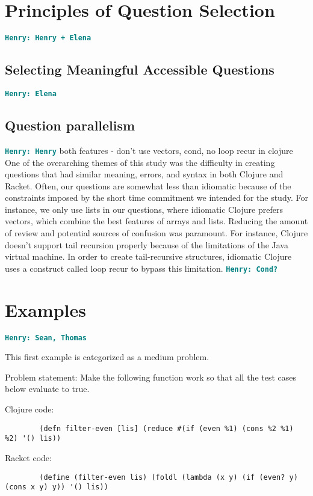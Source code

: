 \documentclass[12pt]{article}
\newcommand{\comment}[1]{{\bf \tt  {#1}}}
\newcommand{\hfcomment}[1]{\textcolor{Teal}{\comment{Henry: {#1}}}}
\begin{document}
\section{Principles of Question Selection}\label{sec:select}
	\hfcomment{Henry + Elena}
	\subsection{Selecting Meaningful Accessible Questions}\label{sec:meaning}
	\hfcomment{Elena}
	\subsection{Question parallelism}\label{sec:parallel}
	\hfcomment{Henry}
	both features - don't use vectors, cond, no loop recur in clojure
	One of the overarching themes of this study was the difficulty in creating questions that had similar meaning, errors, and syntax in both Clojure and Racket.
	 Often, our questions are somewhat less than idiomatic because of the constraints imposed by the short time commitment we intended for the study.
	  For instance, we only use lists in our questions, where idiomatic Clojure prefers vectors, which combine the best features of arrays and lists.
	   Reducing the amount of review and potential sources of confusion was paramount. 
	   For instance, Clojure doesn't support tail recursion properly because of the limitations of the Java virtual machine.
	    In order to create tail-recursive structures, idiomatic Clojure uses a construct called loop recur to bypass this limitation. \hfcomment{Cond?}
\section{Examples}\label{sec:examples}
	\hfcomment{Sean, Thomas}
	
	This first example is categorized as a medium problem. 	
	
	Problem statement:
		Make the following function work so that all the test cases below evaluate to true.
	
	Clojure code:
	\begin{verbatim}
		(defn filter-even [lis] (reduce #(if (even %1) (cons %2 %1) %2) '() lis))
	\end{verbatim}

	Racket code:
	\begin{verbatim}
		(define (filter-even lis) (foldl (lambda (x y) (if (even? y) (cons x y) y)) '() lis))
	\end{verbatim}
\end{document}
